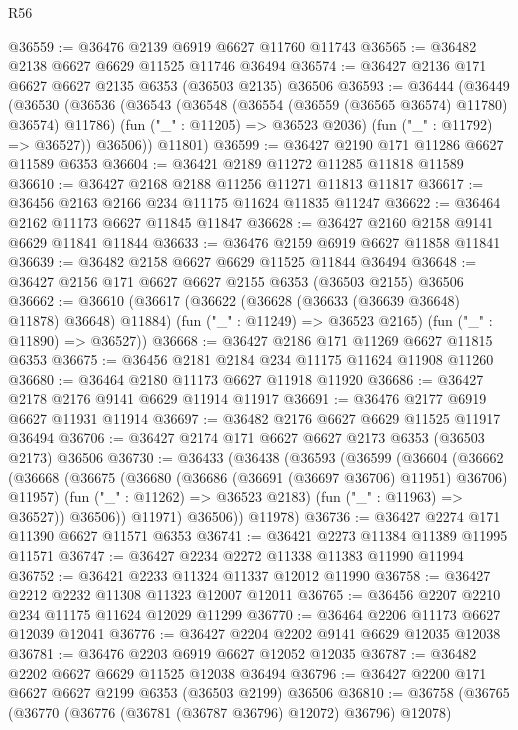 \begin{lexlean}{R56}
\begin{coremodule}
@36559 := @36476 @2139 @6919 @6627 @11760 @11743
@36565 := @36482 @2138 @6627 @6629 @11525 @11746 @36494
@36574 := @36427 @2136 @171 @6627 @6627 @2135 @6353 (@36503 @2135) @36506
@36593 := @36444
    (@36449
      (@36530
        (@36536
          (@36543
            (@36548 (@36554 (@36559 (@36565 @36574) @11780) @36574) @11786)
            (fun ("_" : @11205) => @36523 @2036)
            (fun ("_" : @11792) => @36527))
          @36506))
      @11801)
@36599 := @36427 @2190 @171 @11286 @6627 @11589 @6353
@36604 := @36421 @2189 @11272 @11285 @11818 @11589
@36610 := @36427 @2168 @2188 @11256 @11271 @11813 @11817
@36617 := @36456 @2163 @2166 @234 @11175 @11624 @11835 @11247
@36622 := @36464 @2162 @11173 @6627 @11845 @11847
@36628 := @36427 @2160 @2158 @9141 @6629 @11841 @11844
@36633 := @36476 @2159 @6919 @6627 @11858 @11841
@36639 := @36482 @2158 @6627 @6629 @11525 @11844 @36494
@36648 := @36427 @2156 @171 @6627 @6627 @2155 @6353 (@36503 @2155) @36506
@36662 := @36610
    (@36617
      (@36622 (@36628 (@36633 (@36639 @36648) @11878) @36648) @11884)
      (fun ("_" : @11249) => @36523 @2165)
      (fun ("_" : @11890) => @36527))
@36668 := @36427 @2186 @171 @11269 @6627 @11815 @6353
@36675 := @36456 @2181 @2184 @234 @11175 @11624 @11908 @11260
@36680 := @36464 @2180 @11173 @6627 @11918 @11920
@36686 := @36427 @2178 @2176 @9141 @6629 @11914 @11917
@36691 := @36476 @2177 @6919 @6627 @11931 @11914
@36697 := @36482 @2176 @6627 @6629 @11525 @11917 @36494
@36706 := @36427 @2174 @171 @6627 @6627 @2173 @6353 (@36503 @2173) @36506
@36730 := @36433
    (@36438
      (@36593
        (@36599
          (@36604
            (@36662
              (@36668
                (@36675
                  (@36680 (@36686 (@36691 (@36697 @36706) @11951) @36706) @11957)
                  (fun ("_" : @11262) => @36523 @2183)
                  (fun ("_" : @11963) => @36527))
                @36506))
            @11971)
          @36506))
      @11978)
@36736 := @36427 @2274 @171 @11390 @6627 @11571 @6353
@36741 := @36421 @2273 @11384 @11389 @11995 @11571
@36747 := @36427 @2234 @2272 @11338 @11383 @11990 @11994
@36752 := @36421 @2233 @11324 @11337 @12012 @11990
@36758 := @36427 @2212 @2232 @11308 @11323 @12007 @12011
@36765 := @36456 @2207 @2210 @234 @11175 @11624 @12029 @11299
@36770 := @36464 @2206 @11173 @6627 @12039 @12041
@36776 := @36427 @2204 @2202 @9141 @6629 @12035 @12038
@36781 := @36476 @2203 @6919 @6627 @12052 @12035
@36787 := @36482 @2202 @6627 @6629 @11525 @12038 @36494
@36796 := @36427 @2200 @171 @6627 @6627 @2199 @6353 (@36503 @2199) @36506
@36810 := @36758
    (@36765
      (@36770 (@36776 (@36781 (@36787 @36796) @12072) @36796) @12078)

\end{coremodule}
\end{lexlean}
